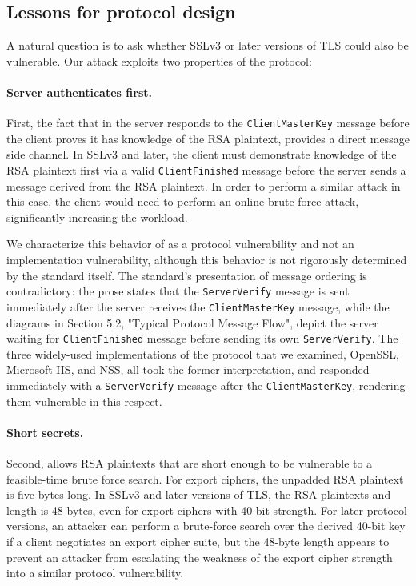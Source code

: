 \subsection{Lessons for protocol design}
A natural question is to ask whether SSLv3 or later versions of TLS could also be vulnerable.
Our attack exploits two properties of the \ssltwo protocol:

\paragraph{Server authenticates first.} 
First, the fact that in \ssltwo the server responds to the \texttt{ClientMasterKey} message before the client proves it has knowledge of the RSA plaintext, provides a direct message side channel. In SSLv3 and later, the client must demonstrate knowledge of the RSA plaintext first via a valid \texttt{ClientFinished} message before the server sends a message derived from the RSA plaintext.  In order to perform a similar attack in this case, the client would need to perform an online brute-force attack\ifext, significantly increasing the workload\fi.

\ifext
We characterize this behavior of \ssltwo as a protocol vulnerability and not an implementation vulnerability, although this behavior is not rigorously determined by the standard itself.  The standard's presentation of message ordering is contradictory: the prose states that the \texttt{ServerVerify} message is sent immediately after the server receives the \texttt{ClientMasterKey} message, while the diagrams in Section 5.2, "Typical Protocol Message Flow", depict the server waiting for \texttt{ClientFinished} message before sending its own \texttt{ServerVerify}.  The three widely-used implementations of the protocol that we examined, OpenSSL, Microsoft IIS, and NSS, all took the former interpretation, and responded immediately with a \texttt{ServerVerify} message after the \texttt{ClientMasterKey}, rendering them vulnerable in this respect. \fi

\paragraph{Short secrets.} Second, \ssltwo allows RSA plaintexts that are short enough to be vulnerable to a feasible-time brute force search.  For export ciphers, the unpadded RSA plaintext is five bytes long.  In SSLv3 and later versions of TLS, the RSA plaintexts and \pms length is 48 bytes, even for export ciphers with 40-bit strength.  For later protocol versions, an attacker can perform a brute-force search over the derived 40-bit key if a client negotiates an export cipher suite, but the 48-byte \pms length appears to prevent an attacker from escalating the weakness of the export cipher strength into a similar protocol vulnerability.

